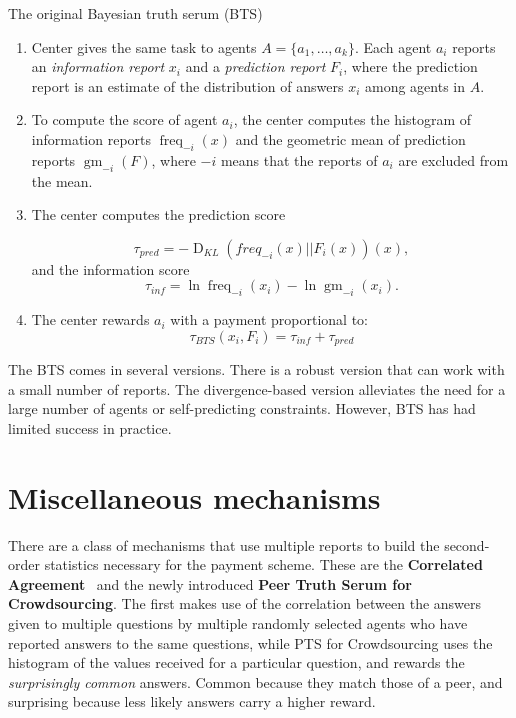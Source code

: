 \documentclass{report}
\theoremstyle{definition}
\begin{document}
\begin{algorithm}
    \caption{The original Bayesian truth serum (BTS)}
    \label{alg:bayesian_truth_serum}
    \begin{enumerate}
        \item{Center gives the same task to agents $A = \{a_1,\dots,a_k\}$. Each agent $a_i$ reports an \emph{information report} $x_i$ and a \emph{prediction report} $F_i$, where the prediction report is an estimate of the distribution of answers $x_i$ among agents in $A$.}
        
        \item{To compute the score of agent $a_i$, the center computes the histogram of information reports $\operatorname{freq}_{-i}(x)$ and the geometric mean of prediction reports $\operatorname{gm}_{-i}(F)$, where $-i$ means that the reports of $a_i$ are excluded from the mean.}
        \item{The center computes the prediction score 
       
        \begin{equation*}
            \tau_{pred} = -\operatorname{D}_{KL}(freq_{-i}(x)|| F_i(x))(x),
        \end{equation*} 
        and the information score
        \begin{equation*}
        \tau_{inf} = \ln{\operatorname{freq}_{-i}(x_i)} - \ln{\operatorname{gm}_{-i}(x_i)}.
        \end{equation*}}
        \item{The center rewards $a_i$ with a payment proportional to:
            \begin{equation*}
                \tau_{BTS}(x_i, F_i) = \tau_{inf} + \tau_{pred}
            \end{equation*}}
    \end{enumerate}
\end{algorithm}

The BTS comes in several versions. There is a robust version that can work with a small number of reports. The divergence-based version alleviates the need for a large number of agents or self-predicting constraints. However, BTS has had limited success in practice.~\cite{faltings:book}

\section{Miscellaneous mechanisms}
There are a class of mechanisms that use multiple reports to build the second-order statistics necessary for the payment scheme. These are the \textbf{Correlated Agreement}~\cite{dasgupta:correlated} and the newly introduced \textbf{Peer Truth Serum for Crowdsourcing}. The first makes use of the correlation between the answers given to multiple questions by multiple randomly selected agents who have reported answers to the same questions, while PTS for Crowdsourcing uses the histogram of the values received for a particular question, and rewards the \emph{surprisingly common} answers. Common because they match those of a peer, and surprising because less likely answers carry a higher reward.~\cite{radanovic:PTS-CS}
 
\end{document}
